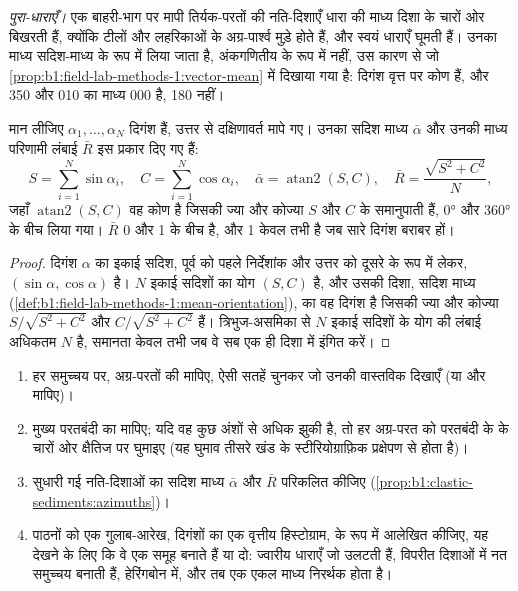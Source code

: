 \emph{पुरा-धाराएँ।} एक बाहरी-भाग पर मापी तिर्यक-परतों की नति-दिशाएँ धारा की माध्य दिशा के चारों ओर बिखरती हैं, क्योंकि टीलों और लहरिकाओं के अग्र-पार्श्व मुड़े होते हैं, और स्वयं धाराएँ घूमती हैं। उनका माध्य सदिश-माध्य के रूप में लिया जाता है, अंकगणितीय के रूप में नहीं, उस कारण से जो \cref{prop:b1:field-lab-methods-1:vector-mean} में दिखाया गया है: दिगंश वृत्त पर कोण हैं, और 350 और 010 का माध्य 000 है, 180 नहीं।

\begin{proposition}[दिगंशों का माध्य]\label{prop:b1:clastic-sediments:azimuths}
मान लीजिए $\alpha_1, \ldots, \alpha_N$ दिगंश हैं, उत्तर से दक्षिणावर्त मापे गए। उनका सदिश माध्य $\bar\alpha$ और उनकी माध्य परिणामी लंबाई $\bar R$ इस प्रकार दिए गए हैं:
\[
  S = \sum_{i=1}^N \sin\alpha_i, \quad C = \sum_{i=1}^N \cos\alpha_i, \quad
  \bar\alpha = \operatorname{atan2}(S, C), \quad \bar R = \frac{\sqrt{S^2 + C^2}}{N},
\]
जहाँ $\operatorname{atan2}(S, C)$ वह कोण है जिसकी ज्या और कोज्या $S$ और $C$ के समानुपाती हैं, \ang{0} और \ang{360} के बीच लिया गया। $\bar R$ 0 और 1 के बीच है, और 1 केवल तभी है जब सारे दिगंश बराबर हों।
\end{proposition}

\begin{proof}
दिगंश $\alpha$ का इकाई सदिश, पूर्व को पहले निर्देशांक और उत्तर को दूसरे के रूप में लेकर, $(\sin\alpha, \cos\alpha)$ है। $N$ इकाई सदिशों का योग
$(S, C)$ है, और उसकी दिशा, सदिश माध्य (\cref{def:b1:field-lab-methods-1:mean-orientation}), का वह दिगंश है जिसकी ज्या और कोज्या $S/\sqrt{S^2+C^2}$ और $C/\sqrt{S^2+C^2}$ हैं। त्रिभुज-असमिका से $N$ इकाई सदिशों के योग की लंबाई अधिकतम $N$ है, समानता केवल तभी जब वे सब एक ही दिशा में इंगित करें।
\end{proof}

\begin{method}[तिर्यक-परत से पुरा-धारा]\label{met:b1:clastic-sediments:palaeocurrent}
\begin{enumerate}
  \item हर समुच्चय पर, अग्र-परतों की  मापिए, ऐसी सतहें चुनकर जो उनकी वास्तविक  दिखाएँ (या  और  मापिए)।
  \item मुख्य परतबंदी का  मापिए; यदि वह कुछ अंशों से अधिक झुकी है, तो हर अग्र-परत को परतबंदी के  के चारों ओर क्षैतिज पर घुमाइए (यह घुमाव तीसरे खंड के स्टीरियोग्राफ़िक प्रक्षेपण से होता है)।
  \item सुधारी गई नति-दिशाओं का सदिश माध्य $\bar\alpha$ और $\bar R$ परिकलित कीजिए (\cref{prop:b1:clastic-sediments:azimuths})।
  \item पाठनों को एक गुलाब-आरेख, दिगंशों का एक वृत्तीय हिस्टोग्राम, के रूप में आलेखित कीजिए, यह देखने के लिए कि वे एक समूह बनाते हैं या दो: ज्वारीय धाराएँ जो उलटती हैं, विपरीत दिशाओं में नत समुच्चय बनाती हैं, हेरिंगबोन  में, और तब एक एकल माध्य निरर्थक होता है।
\end{enumerate}
\end{method}

